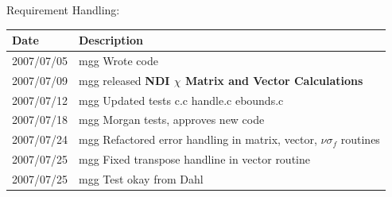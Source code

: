 Requirement Handling:

\begin{tabular}{|p{72pt}|p{351pt}|} \hline
Date & Description \\ \hline
2007/07/05 & mgg Wrote code \\ \hline
2007/07/09 & mgg released \textbf{NDI $\chi$ Matrix and Vector
  Calculations} \\ \hline
2007/07/12 & mgg Updated tests c.c handle.c ebounds.c \\ \hline
2007/07/18 & mgg Morgan tests, approves new code \\ \hline
2007/07/24 & mgg Refactored error handling in matrix, vector, $\nu
\sigma_f$ routines \\ \hline
2007/07/25 & mgg Fixed transpose handline in vector routine \\ \hline
2007/07/25 & mgg Test okay from Dahl \\ \hline
\end{tabular}
